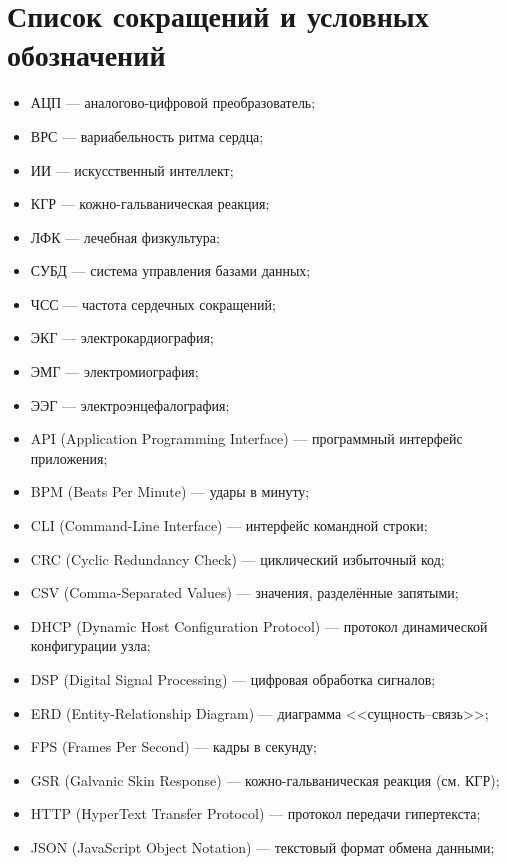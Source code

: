 \documentclass[utf8, russian]{eskdtext}
\begin{document}
\section*{Список сокращений и условных обозначений}

\begin{itemize}[label={}, leftmargin=0pt, itemsep=0pt, parsep=2pt]
    \item АЦП --- аналогово-цифровой преобразователь;
    \item ВРС --- вариабельность ритма сердца;
    \item ИИ --- искусственный интеллект;
    \item КГР --- кожно-гальваническая реакция;
    \item ЛФК --- лечебная физкультура;
    \item СУБД --- система управления базами данных;
    \item ЧСС --- частота сердечных сокращений;
    \item ЭКГ --- электрокардиография;
    \item ЭМГ --- электромиография;
    \item ЭЭГ --- электроэнцефалография;
    \item API (Application Programming Interface) --- программный интерфейс приложения;
    \item BPM (Beats Per Minute) --- удары в минуту;
    \item CLI (Command-Line Interface) --- интерфейс командной строки;
    \item CRC (Cyclic Redundancy Check) --- циклический избыточный код;
    \item CSV (Comma-Separated Values) --- значения, разделённые запятыми;
    \item DHCP (Dynamic Host Configuration Protocol) --- протокол динамической конфигурации узла;
    \item DSP (Digital Signal Processing) --- цифровая обработка сигналов;
    \item ERD (Entity-Relationship Diagram) --- диаграмма <<сущность--связь>>;
    \item FPS (Frames Per Second) --- кадры в секунду;
    \item GSR (Galvanic Skin Response) --- кожно-гальваническая реакция (см. КГР);
    \item HTTP (HyperText Transfer Protocol) --- протокол передачи гипертекста;
    \item JSON (JavaScript Object Notation) --- текстовый формат обмена данными;

\end{itemize}
\end{document}
